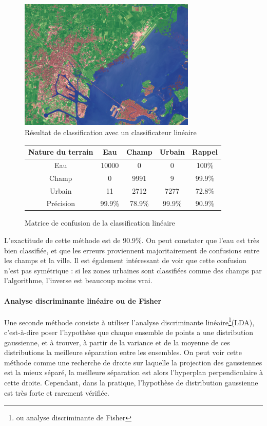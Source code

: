 \documentclass[a4paper,10pt]{article}
\begin{document}
\begin{figure}[H]
  \centering
    \includegraphics[width=0.75\textwidth]{veniseLSE}
  \caption{Résultat de classification avec un classificateur linéaire}
  \label{fig:veniseLSE}
\end{figure}

\begin{figure}[H]
\begin{center}
 \begin{tabular}{|c|c|c|c|c|}
  \hline
  Nature du terrain & Eau & Champ & Urbain & Rappel \\
  \hline
Eau & 10000   &   0    &   0 & 100\% \\
Champ & 0   &  9991     &   9  & 99.9\% \\
Urbain &  11   &     2712  &   7277 & 72.8\% \\
Précision & 99.9\%  & 78.9\% & 99.9\% & {\color{red}90.9\%} \\
  \hline
\end{tabular}
\end{center}
\caption{Matrice de confusion de la classification linéaire}
\label{table:confLSE}
\end{figure}

L'exactitude de cette méthode est de 90.9\%. On peut constater que l'eau est très bien classifiée, et que les erreurs proviennent majoritairement de confusions entre les champs et la ville. Il est également intéressant de voir que cette confusion n'est pas symétrique : si lez zones urbaines sont classifiées comme des champs par l'algorithme, l'inverse est beaucoup moins vrai.

\paragraph{Analyse discriminante linéaire ou de Fisher}
  Une seconde méthode consiste à utiliser l'analyse discriminante linéaire\footnote{ou analyse discriminante de Fisher}(LDA), c'est-à-dire poser l'hypothèse que chaque ensemble de points a une distribution gaussienne, et à trouver, à partir de la variance et de la moyenne de ces distributions la meilleure séparation entre les ensembles. On peut voir cette méthode comme une recherche de droite sur laquelle la projection des gaussiennes est la mieux séparé, la meilleure séparation est alors l'hyperplan perpendiculaire à cette droite. Cependant, dans la pratique, l'hypothèse de distribution gaussienne est très forte et rarement vérifiée.
\end{document}
